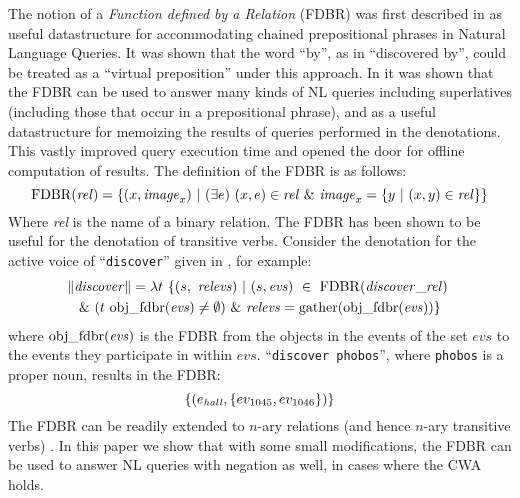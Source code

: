 \documentclass[../main.tex]{subfiles}
\begin{document}
\begin{refsection}
The notion of a \textit{Function defined by a Relation} (FDBR) was first described in \cite{peelar2016accommodating} as useful datastructure for accommodating chained prepositional phrases in Natural Language Queries.  It was shown that the word ``by'', as in ``discovered by'', could be treated as a ``virtual preposition'' under this approach. In \cite{frostpeelar2019} it was shown that the FDBR can be used to answer many kinds of NL queries including superlatives (including those that occur in a prepositional phrase), and as a useful datastructure for memoizing the results of queries performed in the denotations.  This vastly improved query execution time and opened the door for offline computation of results.
The definition of the FDBR is as follows:
\begin{equation*}
		\FDBR{\mathit{rel}} = \{(x, \mathit{image}_x)\ | \ (\exists e)\ (x, e) \in \mathit{rel}\ \& \ \mathit{image}_x = \{ y\ |\ (x, y) \in \mathit{rel} \}  \}
\end{equation*}
Where \textit{rel} is the name of a binary relation.
The FDBR has been shown to be useful for the denotation of transitive verbs.  Consider the denotation for the active voice of ``\texttt{discover}'' given in \cite{peelar2020compositional}, for example:
\begin{multline*}
	\meaningof{discover} =
	\lambda t\ \{ (s,\ \mathit{relevs})\ |\ (s, \mathit{evs})\ \in\ \FDBR{\relation{discover}}\ \\
	\&\ (t\ \objfdbr{evs} \neq \emptyset)\ \&\ \mathit{relevs} = \gatherevs{\objfdbr{evs}} \}
\end{multline*}
where $\mathrm{obj\_fdbr}(\mathit{evs})$ is the FDBR from the objects in the events of the set $\mathit{evs}$ to the events they participate in within $\mathit{evs}$.  ``\texttt{discover phobos}'', where \texttt{phobos} is a proper noun, results in the FDBR:
\begin{equation*}
	\{(e_{\mathit{hall}}, \{ ev_{\mathrm{1045}}, ev_{\mathrm{1046}} \})\}
\end{equation*}
The FDBR can be readily extended to $n$-ary relations (and hence $n$-ary transitive verbs) \cite{peelar2020compositional}. In this paper we show that with some small modifications, the FDBR can be used to answer NL queries with negation as well, in cases where the CWA holds.
%
%


\end{refsection}
\end{document}
